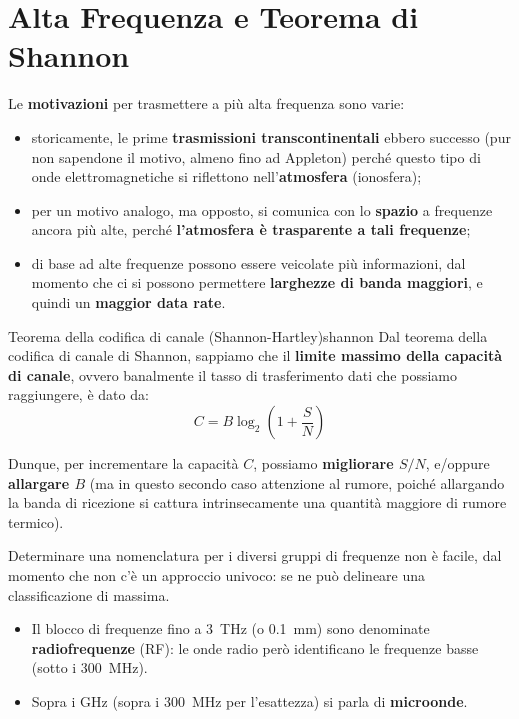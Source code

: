 \documentclass[openany,a4paper,12pt]{book}
\begin{document}
\section{Alta Frequenza e Teorema di Shannon}

Le \textbf{motivazioni} per trasmettere a più alta frequenza sono varie:
\begin{itemize}[label=\textcolor{PoliBlue}{\textbullet}]
    \item storicamente, le prime \textbf{trasmissioni transcontinentali} ebbero successo (pur non sapendone il motivo, almeno fino ad Appleton) perché questo tipo di onde elettromagnetiche si riflettono nell'\textbf{atmosfera} (ionosfera);
    \item per un motivo analogo, ma opposto, si comunica con lo \textbf{spazio} a frequenze ancora più alte, perché \textbf{l'atmosfera è trasparente a tali frequenze};
    \item di base ad alte frequenze possono essere veicolate più informazioni, dal momento che ci si possono permettere \textbf{larghezze di banda maggiori}, e quindi un \textbf{maggior data rate}.
\end{itemize}

\begin{teorema}{Teorema della codifica di canale (Shannon-Hartley)}{shannon}
Dal teorema della codifica di canale di Shannon, sappiamo che il \textbf{limite massimo della capacità di canale}, ovvero banalmente il tasso di trasferimento dati che possiamo raggiungere, è dato da:
\begin{equation}
    C = B \log_2 \left( 1 + \frac{S}{N} \right)
\end{equation}
\end{teorema}

Dunque, per incrementare la capacità $C$, possiamo \textbf{migliorare $S/N$}, e/oppure \textbf{allargare $B$} (ma in questo secondo caso attenzione al rumore, poiché allargando la banda di ricezione si cattura intrinsecamente una quantità maggiore di rumore termico).

Determinare una nomenclatura per i diversi gruppi di frequenze non è facile, dal momento che non c'è un approccio univoco: se ne può delineare una classificazione di massima.

\begin{itemize}[label=\textcolor{PoliBlue}{\textbullet}]
    \item Il blocco di frequenze fino a \qty{3}{\tera\hertz} (o \qty{0.1}{\milli\meter}) sono denominate \textbf{radiofrequenze} (RF): le onde radio però identificano le frequenze basse (sotto i \qty{300}{\mega\hertz}).
    \item Sopra i \unit{\giga\hertz} (sopra i \qty{300}{\mega\hertz} per l'esattezza) si parla di \textbf{microonde}.
\end{itemize}
\end{document}
